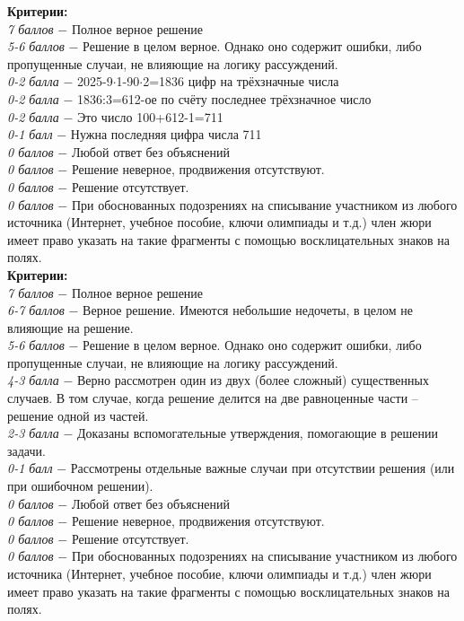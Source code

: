  \textbf{Критерии:} \\
\textit{7 баллов} $-$ Полное верное решение\\
\textit{5-6 баллов} $-$ Решение в целом верное. Однако оно содержит ошибки, либо пропущенные случаи, не влияющие на логику рассуждений.\\
\textit{0-2 балла} $-$ 2025-9$\cdot$1-90$\cdot$2=1836 цифр на трёхзначные числа\\
\textit{0-2 балла} $-$ 1836:3=612-ое по счёту последнее трёхзначное число\\
\textit{0-2 балла} $-$ Это число 100+612-1=711\\
\textit{0-1 балл} $-$ Нужна последняя цифра числа 711\\
\textit{0 баллов} $-$ Любой ответ без объяснений\\
\textit{0 баллов} $-$ Решение неверное, продвижения отсутствуют.\\
\textit{0 баллов} $-$ Решение отсутствует.\\
\textit{0 баллов} $-$ При обоснованных подозрениях на списывание участником из любого источника (Интернет, учебное пособие, ключи олимпиады и т.д.) член жюри имеет право указать на такие фрагменты с помощью восклицательных знаков на полях.\\

 \textbf{Критерии:} \\
\textit{7 баллов} $-$ Полное верное решение\\
\textit{6-7 баллов} $-$ Верное решение. Имеются небольшие недочеты, в целом не влияющие на решение.\\
\textit{5-6 баллов} $-$ Решение в целом верное. Однако оно содержит ошибки, либо пропущенные случаи, не влияющие на логику рассуждений.\\
\textit{4-3 балла} $-$ Верно рассмотрен один из двух (более сложный) существенных случаев. В том случае, когда решение делится на две равноценные части – решение одной из частей. 
\\
\textit{2-3 балла} $-$ Доказаны вспомогательные утверждения, помогающие в решении задачи.
\\
\textit{0-1 балл} $-$ Рассмотрены отдельные важные случаи при отсутствии решения (или при ошибочном решении).\\
\textit{0 баллов} $-$ Любой ответ без объяснений\\
\textit{0 баллов} $-$ Решение неверное, продвижения отсутствуют.\\
\textit{0 баллов} $-$ Решение отсутствует.\\
\textit{0 баллов} $-$ При обоснованных подозрениях на списывание участником из любого источника (Интернет, учебное пособие, ключи олимпиады и т.д.) член жюри имеет право указать на такие фрагменты с помощью восклицательных знаков на полях. \\